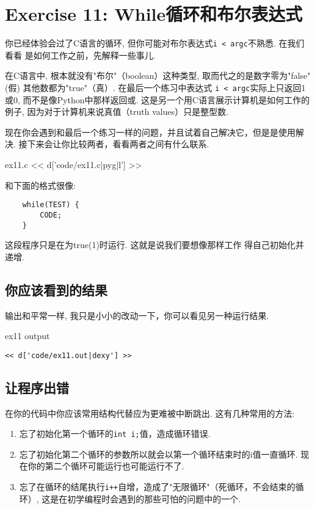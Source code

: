 \chapter{Exercise 11: While循环和布尔表达式}

你已经体验会过了C语言的循环, 但你可能对布尔表达式\verb|i < argc|不熟悉. 在我们看看  是如何工作之前，先解释一些事儿.

在C语言中, 根本就没有"布尔"（boolean）这种类型, 取而代之的是数字零为"false"(假) 其他数都为"true"（真）. 在最后一个练习中表达式 \verb|i < argc|实际上只返回1或0, 而不是像Python中那样返回或. 这是另一个用C语言展示计算机是如何工作的例子, 因为对于计算机来说真值（truth values）只是整型数.

现在你会遇到和最后一个练习一样的问题，并且试着自己解决它，但是是使用解决. 接下来会让你比较两者，看看两者之间有什么联系.

\begin{code}{ex11.c}
<< d['code/ex11.c|pyg|l'] >>
\end{code}

和下面的格式很像:

\begin{Verbatim}
    while(TEST) {
        CODE;
    }
\end{Verbatim}

这段程序只是在为true(1)时运行.
这就是说我们要想像那样工作
得自己初始化并递增.

\section{你应该看到的结果}

输出和平常一样, 我只是小小的改动一下，你可以看见另一种运行结果.

\begin{code}{ex11 output}
\begin{lstlisting}
<< d['code/ex11.out|dexy'] >>
\end{lstlisting}
\end{code}

\section{让程序出错}

在你的代码中你应该常用结构代替应为更难被中断跳出. 这有几种常用的方法:

\begin{enumerate}
\item 忘了初始化第一个循环的\verb|int i;|值，造成循环错误.
\item 忘了初始化第二个循环的参数所以就会以第一个循环结束时的i值一直循环. 现在你的第二个循环可能运行也可能运行不了.
\item 忘了在循环的结尾执行\verb|i++|自增，造成了"无限循环"（死循环，不会结束的循环）, 这是在初学编程时会遇到的那些可怕的问题中的一个.
\end{enumerate}

